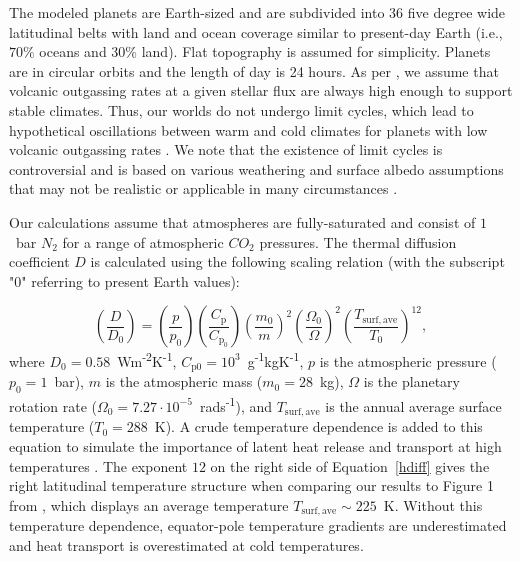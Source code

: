 \documentclass[fleqn,usenatbib]{mnras}
\begin{document}
The modeled planets are Earth-sized and are subdivided into 36 five degree wide latitudinal belts with land and ocean coverage similar to present-day Earth (i.e., $70 \%$ oceans and $30 \%$ land). Flat topography is assumed for simplicity. Planets are in circular orbits and the length of day is 24 hours. As per \citet{Turbet2017}, we assume that volcanic outgassing rates at a given stellar flux are always high enough to support stable climates. Thus, our worlds do not undergo limit cycles, which lead to hypothetical oscillations between warm and cold climates for planets with low volcanic outgassing rates \citep{haqq2016limit,paradise2017,kadoya_outer_2019}. We note that the existence of limit cycles is controversial and is based on various weathering and surface albedo assumptions that may not be realistic or applicable in many circumstances \citep{ramirez2017mars,graham-a}.

Our calculations assume that atmospheres are fully-saturated and consist of $1$~bar $N_{\mathrm{2}}$ for a range of atmospheric $CO_{\mathrm{2}}$ pressures. The thermal diffusion coefficient $D$ is calculated using the following scaling relation (with the subscript "$0$" referring to present Earth values):

\begin{equation}
\label{hdiff}
    \left(\frac{D}{D_{\mathrm{0}}}\right)=\left(\frac{p}{p_{\mathrm{0}}}\right)\left(\frac{C_{\mathrm{p}}}{C_{\mathrm{p}_{0}}}\right)\left(\frac{m_{\mathrm{0}}}{m}\right)^{2}\left(\frac{\Omega_{0}}{\Omega}\right)^{2}\left(\frac{T_{\mathrm{surf,ave}}}{T_{\mathrm{0}}}\right)^{12},
\end{equation}
where $D_{\mathrm{0}}=0.58$~Wm\textsuperscript{-2}K\textsuperscript{-1}, $C_{\mathrm{p0}}=10^{3}$~g\textsuperscript{-1}kgK\textsuperscript{-1}, $p$ is the atmospheric pressure ($p_{\mathrm{0}}=1$~bar), $m$ is the atmospheric mass ($m_{\mathrm{0}}=28$~kg), $\Omega$ is the planetary rotation rate ($\Omega_{\mathrm{0}}=7.27 \cdot 10^{\mathrm{-5}}$~rads\textsuperscript{-1}), and $T_{\mathrm{surf,ave}}$ is the annual average surface temperature ($T_{\mathrm{0}}=288$~K). A crude temperature dependence is added to this equation to simulate the importance of latent heat release and transport at high temperatures \citep{Caballero2005a,Rose2017}. The exponent $12$ on the right side of Equation~\ref{hdiff} gives the right latitudinal temperature structure when comparing our results to Figure 1 from \citet{Turbet2017}, which displays an average temperature $T_{\mathrm{surf,ave}} \sim 225$~K. Without this temperature dependence, equator-pole temperature gradients are underestimated and heat transport is overestimated at cold temperatures.
\end{document}
